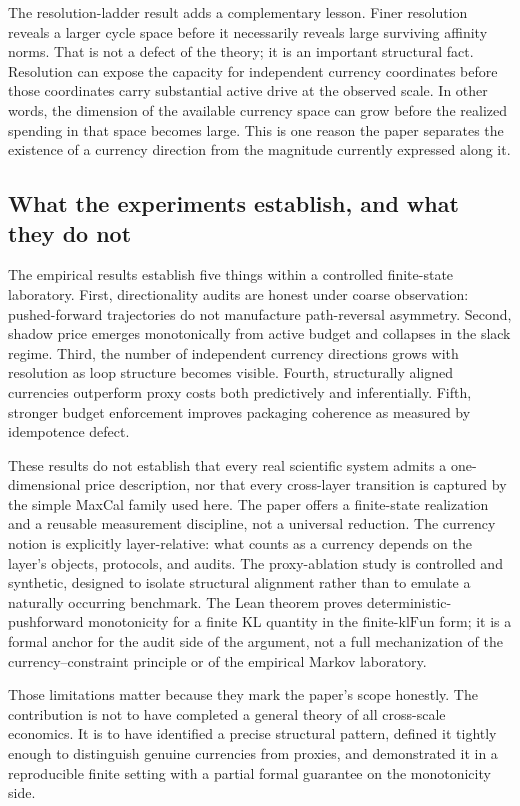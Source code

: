 \documentclass[11pt,a4paper]{article}
\begin{document}
The resolution-ladder result adds a complementary lesson. Finer resolution reveals a larger cycle space before it necessarily reveals large surviving affinity norms. That is not a defect of the theory; it is an important structural fact. Resolution can expose the capacity for independent currency coordinates before those coordinates carry substantial active drive at the observed scale. In other words, the dimension of the available currency space can grow before the realized spending in that space becomes large. This is one reason the paper separates the existence of a currency direction from the magnitude currently expressed along it.

\subsection{What the experiments establish, and what they do not}

The empirical results establish five things within a controlled finite-state laboratory. First, directionality audits are honest under coarse observation: pushed-forward trajectories do not manufacture path-reversal asymmetry. Second, shadow price emerges monotonically from active budget and collapses in the slack regime. Third, the number of independent currency directions grows with resolution as loop structure becomes visible. Fourth, structurally aligned currencies outperform proxy costs both predictively and inferentially. Fifth, stronger budget enforcement improves packaging coherence as measured by idempotence defect.

These results do not establish that every real scientific system admits a one-dimensional price description, nor that every cross-layer transition is captured by the simple MaxCal family used here. The paper offers a finite-state realization and a reusable measurement discipline, not a universal reduction. The currency notion is explicitly layer-relative: what counts as a currency depends on the layer's objects, protocols, and audits. The proxy-ablation study is controlled and synthetic, designed to isolate structural alignment rather than to emulate a naturally occurring benchmark. The Lean theorem proves deterministic-pushforward monotonicity for a finite KL quantity in the finite-\(\mathrm{klFun}\) form; it is a formal anchor for the audit side of the argument, not a full mechanization of the currency--constraint principle or of the empirical Markov laboratory.

Those limitations matter because they mark the paper's scope honestly. The contribution is not to have completed a general theory of all cross-scale economics. It is to have identified a precise structural pattern, defined it tightly enough to distinguish genuine currencies from proxies, and demonstrated it in a reproducible finite setting with a partial formal guarantee on the monotonicity side.
\end{document}
